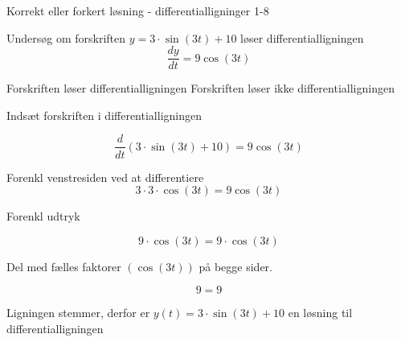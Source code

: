 \documentclass{article}
\begin{document}
\begin{exercise}{Korrekt eller forkert løsning - differentialligninger 1-8}


Undersøg om forskriften $y = 3 \cdot \sin(3t) + 10$ løser differentialligningen
\[
\frac{dy}{dt} = 9 \cos(3t)
\]

\begin{multichoice}
\itemtrue Forskriften løser differentialligningen
\itemfalse Forskriften løser ikke differentialligningen
\end{multichoice}

\hint

Indsæt forskriften i differentialligningen

\hint
\[
\frac{d}{dt} \left( 3 \cdot \sin(3t) + 10 \right) = 9 \cos(3t)
\]


\hint

Forenkl venstresiden ved at differentiere
\[
3 \cdot 3 \cdot \cos(3t) = 9 \cos(3t)
\]

\hint

Forenkl udtryk

\hint
\[
9 \cdot \cos(3t) = 9 \cdot \cos(3t)
\]

\hint
Del med fælles faktorer $\left( \cos(3t) \right)$ på begge sider.

\hint

\[
9 = 9
\]


\hint

Ligningen stemmer, derfor er $y(t) = 3 \cdot \sin(3t) + 10$ en løsning til differentialligningen

\end{exercise}

\newpage
\end{document}
